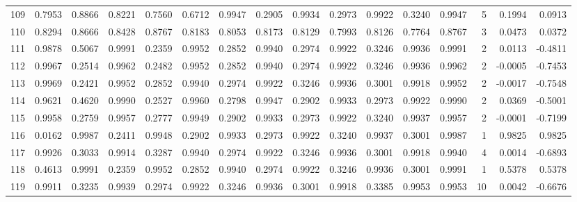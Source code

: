 \begin{tabular}{lrrrrrrrrrrrrrrr}
109 &      0.7953 &  0.8866 &  0.8221 &  0.7560 &  0.6712 &  0.9947 &  0.2905 &  0.9934 &  0.2973 &  0.9922 &   0.3240 &     0.9947 &      5 &                    0.1994 &                     0.0913 \\
110 &      0.8294 &  0.8666 &  0.8428 &  0.8767 &  0.8183 &  0.8053 &  0.8173 &  0.8129 &  0.7993 &  0.8126 &   0.7764 &     0.8767 &      3 &                    0.0473 &                     0.0372 \\
111 &      0.9878 &  0.5067 &  0.9991 &  0.2359 &  0.9952 &  0.2852 &  0.9940 &  0.2974 &  0.9922 &  0.3246 &   0.9936 &     0.9991 &      2 &                    0.0113 &                    -0.4811 \\
112 &      0.9967 &  0.2514 &  0.9962 &  0.2482 &  0.9952 &  0.2852 &  0.9940 &  0.2974 &  0.9922 &  0.3246 &   0.9936 &     0.9962 &      2 &                   -0.0005 &                    -0.7453 \\
113 &      0.9969 &  0.2421 &  0.9952 &  0.2852 &  0.9940 &  0.2974 &  0.9922 &  0.3246 &  0.9936 &  0.3001 &   0.9918 &     0.9952 &      2 &                   -0.0017 &                    -0.7548 \\
114 &      0.9621 &  0.4620 &  0.9990 &  0.2527 &  0.9960 &  0.2798 &  0.9947 &  0.2902 &  0.9933 &  0.2973 &   0.9922 &     0.9990 &      2 &                    0.0369 &                    -0.5001 \\
115 &      0.9958 &  0.2759 &  0.9957 &  0.2777 &  0.9949 &  0.2902 &  0.9933 &  0.2973 &  0.9922 &  0.3240 &   0.9937 &     0.9957 &      2 &                   -0.0001 &                    -0.7199 \\
116 &      0.0162 &  0.9987 &  0.2411 &  0.9948 &  0.2902 &  0.9933 &  0.2973 &  0.9922 &  0.3240 &  0.9937 &   0.3001 &     0.9987 &      1 &                    0.9825 &                     0.9825 \\
117 &      0.9926 &  0.3033 &  0.9914 &  0.3287 &  0.9940 &  0.2974 &  0.9922 &  0.3246 &  0.9936 &  0.3001 &   0.9918 &     0.9940 &      4 &                    0.0014 &                    -0.6893 \\
118 &      0.4613 &  0.9991 &  0.2359 &  0.9952 &  0.2852 &  0.9940 &  0.2974 &  0.9922 &  0.3246 &  0.9936 &   0.3001 &     0.9991 &      1 &                    0.5378 &                     0.5378 \\
119 &      0.9911 &  0.3235 &  0.9939 &  0.2974 &  0.9922 &  0.3246 &  0.9936 &  0.3001 &  0.9918 &  0.3385 &   0.9953 &     0.9953 &     10 &                    0.0042 &                    -0.6676 \\

\end{tabular}
